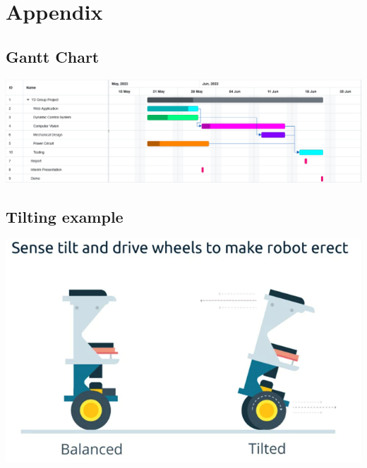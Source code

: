 \section{Appendix}
\appendix

\renewcommand{\thesubsection}{\Alph{subsection}}

\subsection{Gantt Chart}
\label{app:gantt}
\begin{center}
    \includegraphics[width=\textwidth]{includes/Y2GanttChartt.pdf}
\end{center}

\subsection{Tilting example}
\begin{center}
    \includegraphics[width=\textwidth]{images/balancing-image.png}
\end{center}

